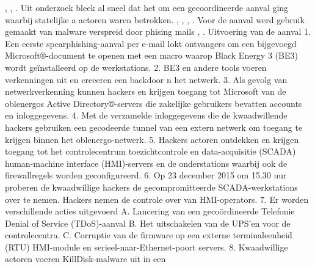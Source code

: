 \documentclass{article}
\begin{document}
	\cite{cerulus2019FrontlineRussiaAttack},
	\cite{desarnaud2017cyberattacks},
	\cite{dragos2019TargetedTransStation}.
	\cite{shehod2016gridadvantageus}
	Uit onderzoek bleek al sneel dat het om een gecoordineerde aanval ging waarbij statelijke a actoren waren betrokken.
	\cite{rocha2017cybersecyrityanalysisScada},
	\cite{2017crashoverridenostuxnet},
	\cite{vijayan2017firstmalwareCausedOutage},
	\cite{slowik2019ReassasUkraine2016Attack}.
	Voor de aanval werd gebruik gemaakt van malware verspreid door phising mails
	\cite{2015ukrainegridattack},
	\cite{industroyershortfact}.
	{Uitvoering van de aanval}
	1. Een eerste spearphishing-aanval per e-mail lokt ontvangers
	om een bijgevoegd Microsoft®-document te openen met een
	macro waarop Black Energy 3 (BE3) wordt geïnstalleerd
	op de werkstations.
	2. BE3 en andere tools voeren verkenningen uit en
	creeeren een backdoor n het netwerk.
	3. Als gevolg van netwerkverkenning kunnen hackers
	en krijgen toegang tot Microsoft van de oblenergos
	Active Directory®-servers die zakelijke gebruikers bevatten
	accounts en inloggegevens.
	4. Met de verzamelde inloggegevens die de kwaadwillende hackers gebruiken
	een gecodeerde tunnel van een extern netwerk om toegang te krijgen
	binnen het oblenergo-netwerk.
	5. Hackers actoren ontdekken en krijgen toegang tot het controlecentrum toezichtcontrole en data-acquisitie (SCADA) human-machine interface (HMI)-servers en de
	onderstations waarbij ook de firewallregels worden 
	geconfigureerd.
	6. Op 23 december 2015 om 15.30 uur proberen de kwaadwillige hackers
	de gecompromitteerde SCADA-werkstations over te nemen.
	Hackers nemen de controle over van HMI-operators.
	7. Er worden verschillende acties uitgevoerd
	A. Lancering van een gecoördineerde Telefonie Denial of
	Service (TDoS)-aanval 
	B. Het uitschakelen van de UPS'en voor de controlecentra.
	C. Corruptie van de firmware op een externe terminaleenheid
	(RTU) HMI-module en serieel-naar-Ethernet-poort
	servers.
	8. Kwaadwillige actoren voeren KillDisk-malware uit in een
\end{document}
